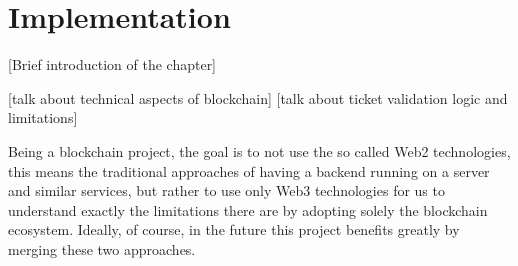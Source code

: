 \chapter{Implementation}
 [Brief introduction of the chapter]


 [talk about technical aspects of blockchain]
 [talk about ticket validation logic and limitations]

Being a blockchain project, the goal is to not use the so called Web2 technologies, this means the traditional approaches of having a backend running on a server and similar services, but rather to use only Web3 technologies for us to understand exactly the limitations there are by adopting solely the blockchain ecosystem. Ideally, of course, in the future this project benefits greatly by merging these two approaches.
